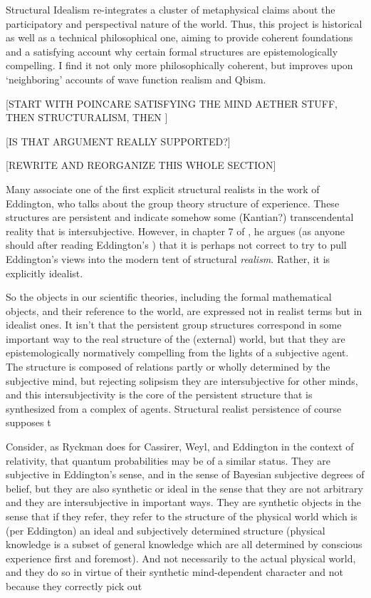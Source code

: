 Structural Idealism re-integrates a cluster of metaphysical claims about the participatory and perspectival nature of the world.  Thus, this project is historical as well as a technical philosophical one, aiming to provide coherent foundations and a satisfying account why certain formal structures are epistemologically compelling.  I find it not only more philosophically coherent, but improves upon `neighboring' accounts of wave function realism and Qbism.  

[START WITH POINCARE SATISFYING THE MIND AETHER STUFF, THEN STRUCTURALISM, THEN ]

[IS THAT ARGUMENT REALLY SUPPORTED?]

[REWRITE AND REORGANIZE THIS WHOLE SECTION]


Many associate one of the first explicit structural realists in the work of Eddington, who talks about the group theory structure of experience.  These structures are persistent and indicate somehow some  (Kantian?) transcendental reality that is intersubjective.  However, in chapter 7 of \cite{Ryckman2005}, he argues (as anyone should after reading Eddington's \cite{Eddington1939}) that it is perhaps not correct to try to pull Eddington's views into the modern tent of structural \emph{realism}.  Rather, it is explicitly idealist.  

So the objects in our scientific theories, including the formal mathematical objects, and their reference to the world, are expressed not in realist terms but in idealist ones.  It isn't that the persistent group structures correspond in some important way to the real structure of the (external) world, but that they are epistemologically normatively compelling from the lights of a subjective agent.  The structure is composed of relations partly or wholly determined by the subjective mind, but rejecting solipsism they are intersubjective for other minds, and this intersubjectivity is the core of the persistent structure that is synthesized from a complex of agents.  Structural realist persistence of course supposes t



Consider, as Ryckman does for Cassirer, Weyl, and Eddington in the context of relativity, that quantum probabilities may be of a similar status.  They are subjective in Eddington's sense, and in the sense of Bayesian subjective degrees of belief, but they are also synthetic or ideal in the sense that they are not arbitrary and they are intersubjective in important ways.  They are synthetic objects in the sense that if they refer, they refer to the structure of the physical world which is (per Eddington) an ideal and subjectively determined structure (physical knowledge is a subset of general knowledge which are all determined by conscious experience first and foremost).  And not necessarily to the actual physical world, and they do so in virtue of their synthetic mind-dependent character and not because they correctly pick out 





